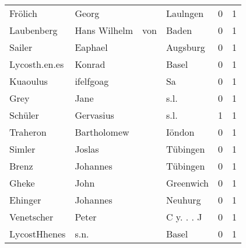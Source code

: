 \begin{center}
\begin{tiny}
\begin{longtabu}{llllrr}
                  Frölich &                              Georg &             &                                    Laulngen &          0 &         1 \\
               Laubenberg &                       Hans Wilhelm &         von &                                       Baden &          0 &         1 \\
                   Sailer &                            Eaphael &             &                                    Augsburg &          0 &         1 \\
            Lycosth.en.es &                             Konrad &             &                                       Basel &          0 &         1 \\
                 Kuaoulus &                          ifelfgoag &             &                                          Sa &          0 &         1 \\
                     Grey &                               Jane &             &                                        s.l. &          0 &         1 \\
                  Schüler &                          Gervasius &             &                                        s.l. &          1 &         1 \\
                 Traheron &                        Bartholomew &             &                                      Iöndon &          0 &         1 \\
                   Simler &                             Joslas &             &                                    Tübingen &          0 &         1 \\
                    Brenz &                           Johannes &             &                                    Tübingen &          0 &         1 \\
                    Gheke &                               John &             &                                   Greenwich &          0 &         1 \\
                  Ehinger &                           Johannes &             &                                     Neuhurg &          0 &         1 \\
               Venetscher &                              Peter &             &                                  C y. . . J &          0 &         1 \\
             LycostHhenes &                               s.n. &             &                                       Basel &          0 &         1 \\

\end{longtabu}
\end{tiny}
\end{center}
